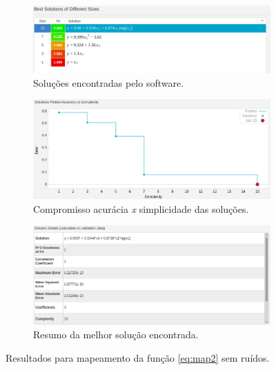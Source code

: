 	\begin{figure}[h!]
	
	\centering
	
		\begin{subfigure}{.45\textwidth} 
		  \centering
		  \includegraphics[width=1\linewidth]{image/solucoes_map2}
		  \caption{\centering Soluções encontradas pelo software.} 
		  \label{fig:map2_solucoes_s_ruido} 
		\end{subfigure}%
		\begin{subfigure}{.55\textwidth}
		  \centering
		  \includegraphics[width=1\linewidth]{image/pareto_map2}
		  \caption{\centering Compromisso acurácia \textit{x} simplicidade das
		  soluções.}
		  \label{fig:map2_pareto_s_ruido} 
		\end{subfigure}
	
		\begin{subfigure}{.65\textwidth}
		  \centering
		  \includegraphics[width=1\linewidth]{image/best_solucao_map2_info}
		  \caption{\centering Resumo da melhor solução encontrada.}
		  \label{fig:map2_best_s_ruido} 
		\end{subfigure}
	
	\caption{Resultados para mapeamento da função \ref{eq:map2} sem ruídos.}
	\end{figure}
	
